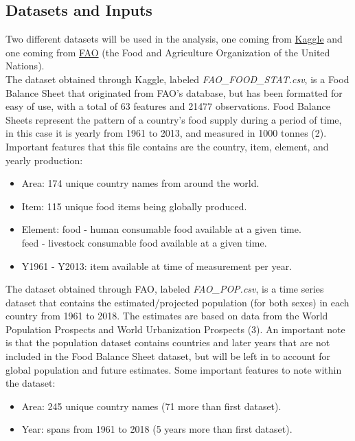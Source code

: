 \documentclass[12pt, a4paper]{article}
\begin{document}
\begin{spacing}{1.1}
	\section{Datasets and Inputs}
	Two different datasets will be used in the analysis, one coming from \href{https://www.kaggle.com/dorbicycle/world-foodfeed-production}{Kaggle} and one coming from \href{http://www.fao.org/faostat/en/#data/OA}{FAO} (the Food and Agriculture Organization of the United Nations).\vspace*{2mm}\\	
	The dataset obtained through Kaggle, labeled \textit{FAO\_FOOD\_STAT.csv}, is a Food Balance Sheet that originated from FAO's database, but has been formatted for easy of use, with a total of 63 features and 21477 observations. Food Balance Sheets represent the pattern of a country's food supply during a period of time, in this case it is yearly from 1961 to 2013, and measured in 1000 tonnes (2). Important features that this file contains are the country, item, element, and yearly production:
	\begin{itemize}
		\item Area: 174 unique country names from around the world.
		\item Item: 115 unique food items being globally produced.
		\item Element: food - human consumable food available at a given time. \\ 
		\hspace*{16.5mm} feed - livestock consumable food available at a given time.
		\item Y1961 - Y2013: item available at time of measurement per year.
	\end{itemize} \vspace*{2mm}
	The dataset obtained through FAO, labeled \textit{FAO\_POP.csv}, is a time series dataset that contains the estimated/projected population (for both sexes) in each country from 1961 to 2018. The estimates are based on data from the World Population Prospects and World Urbanization Prospects (3). An important note is that the population dataset contains countries and later years that are not included in the Food Balance Sheet dataset, but will be left in to account for global population and future estimates. Some important features to note within the dataset:
	\begin{itemize}
		\item Area: 245 unique country names (71 more than first dataset).
		\item Year: spans from 1961 to 2018 (5 years more than first dataset).

\end{itemize}
\end{spacing}
\end{document}

